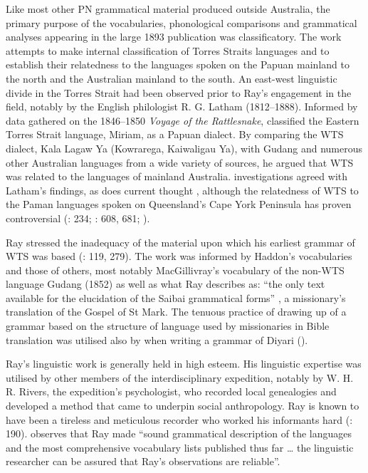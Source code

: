 Like most other PN grammatical material produced outside Australia, the primary purpose of the vocabularies, phonological comparisons and grammatical analyses appearing in the large 1893 publication was classificatory. The work attempts to make internal classification of Torres Straits languages and to establish their relatedness to the languages spoken on the Papuan mainland to the north and the Australian mainland to the south. An east-west linguistic divide in the Torres Strait had been observed prior to Ray’s engagement in the field, notably by the English philologist R. G. Latham (1812--1888). Informed by data gathered on the 1846--1850 \textit{Voyage of the Rattlesnake}, \citet{gordon_remarks_1852} classified the Eastern Torres Strait language, Miriam, as a Papuan dialect. By comparing the WTS dialect, Kala Lagaw Ya (Kowrarega, Kaiwaligau Ya), with Gudang and numerous other Australian languages from a wide variety of sources, he argued that WTS was related to the languages of mainland Australia.  investigations agreed with Latham’s findings, as does current thought \citep{alpher_western_2008}, although the relatedness of WTS to the Paman languages spoken on Queensland’s Cape York Peninsula has proven controversial (\citealt{dixon_languages_1980}: 234; \citeyear{dixon_preface_2002}: 608, 681; \citealt{hunter_reappraising_2011}).

Ray stressed the inadequacy of the material upon which his earliest grammar of WTS was based (\citeyear{ray_study_1893}: 119, 279). The work was informed by Haddon’s vocabularies and those of others, most notably MacGillivray’s vocabulary of the non-WTS language Gudang (1852) as well as what Ray describes as: “the only text available for the elucidation of the Saibai grammatical forms” \citep[119]{ray_study_1893}, a missionary’s translation of the Gospel of St Mark. The tenuous practice of drawing up of a grammar based on the structure of language used by missionaries in Bible translation was utilised also by \citet{gatti_lingua_1930} when writing a grammar of Diyari ().

Ray’s linguistic work is generally held in high esteem. His linguistic expertise was utilised by other members of the interdisciplinary expedition, notably by W. H. R. Rivers, the expedition’s psychologist, who recorded local genealogies and developed a method that came to underpin social anthropology. Ray is known to have been a tireless and meticulous recorder who worked his informants hard (\citealt{shnukal_at_1998}: 190). \citet[181]{shnukal_at_1998} observes that Ray made “sound grammatical description of the languages and the most comprehensive vocabulary lists published thus far … the linguistic researcher can be assured that Ray’s observations are reliable”.

